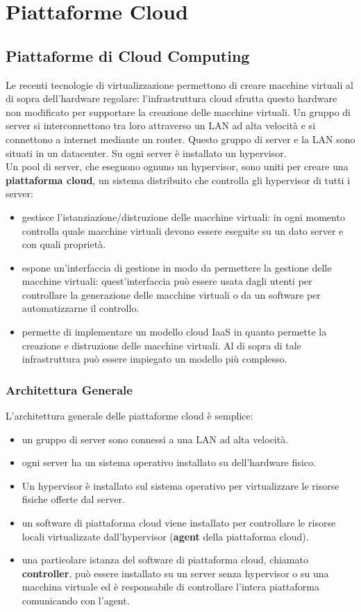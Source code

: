\documentclass{article}
\begin{document}
\newpage
\section{Piattaforme Cloud}
\subsection{Piattaforme di Cloud Computing}
Le recenti tecnologie di virtualizzazione permettono di creare macchine virtuali al di sopra dell'hardware regolare: l'infrastruttura cloud sfrutta questo hardware non modificato per supportare la creazione delle macchine virtuali. Un gruppo di server si interconnettono tra loro attraverso un LAN ad alta velocità e si connettono a internet mediante un router. Questo gruppo di server e la LAN sono situati in un datacenter. Su ogni server è installato un hypervisor.\\
Un pool di server, che eseguono ognuno un hypervisor, sono uniti per creare una \textbf{piattaforma cloud}, un sistema distribuito che controlla gli hypervisor di tutti i server:
\begin{itemize}
    \item gestisce l'istanziazione/distruzione delle macchine virtuali: in ogni momento controlla quale macchine virtuali devono essere eseguite su un dato server e con quali proprietà.
    \item espone un'interfaccia di gestione in modo da permettere la gestione delle macchine virtuali: quest'interfaccia può essere usata dagli utenti per controllare la generazione delle macchine virtuali o da un software per automatizzarne il controllo.
    \item permette di implementare un modello cloud IaaS in quanto permette la creazione e distruzione delle macchine virtuali. Al di sopra di tale infrastruttura può essere impiegato un modello più complesso.
\end{itemize}

\subsubsection{Architettura Generale}
L'architettura generale delle piattaforme cloud è semplice:
\begin{itemize}
    \item un gruppo di server sono connessi a una LAN ad alta velocità.
    \item ogni server ha un sistema operativo installato su dell'hardware fisico.
    \item Un hypervisor è installato sul sistema operativo per virtualizzare le risorse fisiche offerte dal server.
    \item un software di piattaforma cloud viene installato per controllare le risorse locali virtualizzate dall'hypervisor (\textbf{agent} della piattaforma cloud).
    \item una particolare istanza del software di piattaforma cloud, chiamato \textbf{controller}, può essere installato su un server senza hypervisor o su una macchina virtuale ed è responsabile di controllare l'intera piattaforma comunicando con l'agent.
\end{itemize}
\end{document}
